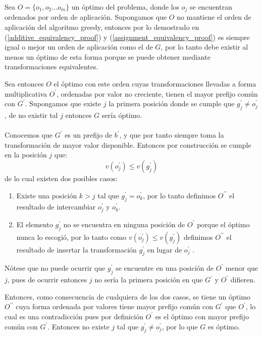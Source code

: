 \documentclass{article}
\theoremstyle{default}
\begin{document}
	Sea $O = \{o_1, o_2 \dots o_m\}$ un óptimo del problema, donde los $o_j$ se encuentran ordenados por orden de aplicación. Supongamos que $O$ no mantiene el orden de aplicación del algoritmo greedy, entonces por lo demostrado en (\ref{additive_equivalency_proof}) y (\ref{assignment_equivalency_proof}) es siempre igual o mejor un orden de aplicación como el de $G$, por lo tanto debe existir al menos un óptimo de esta forma porque se puede obtener mediante transformaciones equivalentes.

	Sea entonces $O$ el óptimo con este orden cuyas transformaciones llevadas a forma multiplicativa $O^\prime$, ordenadas por valor no creciente, tienen el mayor prefijo común con $G^\prime$. Supongamos que existe $j$ la primera posición donde se cumple que $g_j^\prime \neq o_j^\prime$, de no existir tal $j$ entonces $G$ sería óptimo.

\paragraph{}
	Conocemos que $G^\prime$ es un prefijo de $b^{\prime}$, y que por tanto siempre toma la transformación de mayor valor disponible. Entonces por construcción se cumple en la posición $j$ que:
%
	\begin{equation*}
		v(o_j^\prime) \leq v(g_j^\prime)
	\end{equation*}
%
	de lo cual existen dos posibles casos:
%
	\begin{enumerate}
		\item Existe una posición $k > j$ tal que $g_j^\prime = o_k^\prime$, por lo tanto definimos $O^{\prime\prime}$ el resultado de intercambiar $o_j^\prime$ y $o_k^\prime$.
		
		\item El elemento $g_j^\prime$ no se encuentra en ninguna posición de $O^\prime$ porque el óptimo nunca lo escogió, por lo tanto como $v(o_j^\prime) \leq v(g_j^\prime)$ definimos $O^{\prime\prime}$ el resultado de insertar la transformación $g_j^\prime$ en lugar de $o_j^\prime$ .
	\end{enumerate}
%
	Nótese que no puede ocurrir que $g_j^\prime$ se encuentre en una posición de $O^\prime$ menor que $j$, pues de ocurrir entonces $j$ no sería la primera posición en que $G^\prime$ y $O^\prime$ difieren.

	Entonces, como consecuencia de cualquiera de los dos casos, se tiene un óptimo $O^{\prime\prime}$ cuya forma ordenada por valores tiene mayor prefijo común con $G^\prime$ que $O^\prime$, lo cual es una contradicción pues por definición $O^\prime$ es el óptimo con mayor prefijo común con $G^\prime$. Entonces no existe $j$ tal que $g_j^\prime \neq o_j^\prime$, por lo que $G$ es óptimo.
\end{document}
